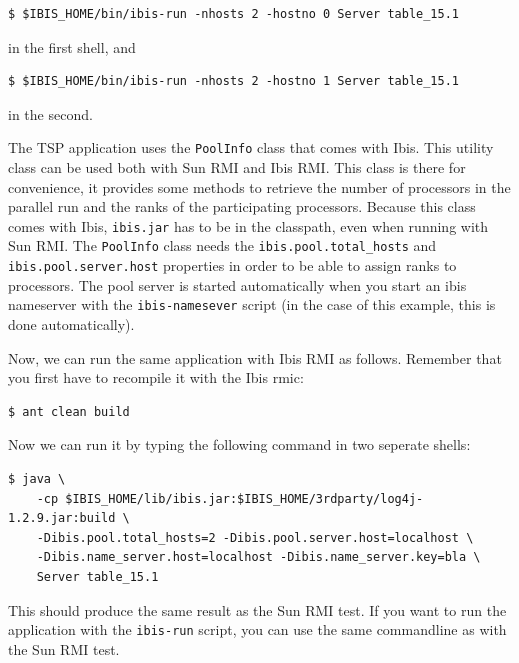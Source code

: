 \documentclass[10pt]{article}
\begin{document}
\noindent
{\small
\begin{verbatim}
$ $IBIS_HOME/bin/ibis-run -nhosts 2 -hostno 0 Server table_15.1
\end{verbatim}
}

\noindent
in the first shell, and

\noindent
{\small
\begin{verbatim}
$ $IBIS_HOME/bin/ibis-run -nhosts 2 -hostno 1 Server table_15.1
\end{verbatim}
}

\noindent in the second.

The TSP application uses the \texttt{PoolInfo}
class that comes with Ibis. This utility class can be used both with
Sun RMI and Ibis RMI. This class is there for convenience, it provides
some methods to retrieve the number of processors in the parallel run
and the ranks of the participating processors. Because this class
comes with Ibis, \texttt{ibis.jar} has to be in the classpath, even
when running with Sun RMI.  The \texttt{PoolInfo} class needs the
\texttt{ibis.pool.total\_hosts} and \texttt{ibis.pool.server.host}
properties in order to be able to assign ranks to processors. The
pool server is started automatically when you start an ibis nameserver
with the \texttt{ibis-namesever} script (in the case of this example, this is done automatically).

Now, we can run the same application with Ibis RMI as follows.
Remember that you first have to recompile it with the Ibis rmic:

\noindent
{\small
\begin{verbatim}
$ ant clean build
\end{verbatim}
}
\noindent
Now we can run it by typing the following command in two seperate shells:

\noindent
{\small
\begin{verbatim}
$ java \
    -cp $IBIS_HOME/lib/ibis.jar:$IBIS_HOME/3rdparty/log4j-1.2.9.jar:build \
    -Dibis.pool.total_hosts=2 -Dibis.pool.server.host=localhost \
    -Dibis.name_server.host=localhost -Dibis.name_server.key=bla \
    Server table_15.1 
\end{verbatim}
}
\noindent

This should produce the same result as the Sun RMI test.
If you want to run the application with the \texttt{ibis-run} script,
you can use the same commandline as with the Sun RMI test.
\end{document}
